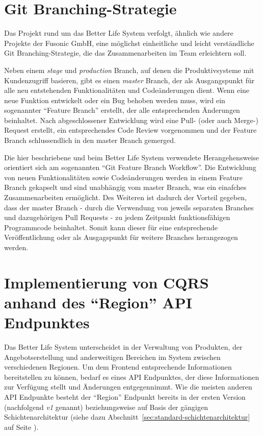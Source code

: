 \documentclass[a4paper,12pt,twoside]{scrreprt}
\begin{document}
\section{Git Branching-Strategie}
\label{sec:git-branching-strategie}
Das Projekt rund um das Better Life System verfolgt, ähnlich wie andere Projekte der Fusonic GmbH, eine möglichst einheitliche und leicht verständliche Git Branching-Strategie, die das Zusammenarbeiten im Team erleichtern soll.

\medskip

Neben einem \textit{stage} und \textit{production} Branch, auf denen die Produktivsysteme mit Kundenzugriff basieren, gibt es einen \textit{master} Branch, der als Ausgangspunkt für alle neu entstehenden Funktionalitäten und Codeänderungen dient. Wenn eine neue Funktion entwickelt oder ein Bug behoben werden muss, wird ein sogenannter \enquote{Feature Branch} erstellt, der alle entsprechenden Änderungen beinhaltet. Nach abgeschlossener Entwicklung wird eine Pull- (oder auch Merge-) Request erstellt, ein entsprechendes Code Review vorgenommen und der Feature Branch schlussendlich in den master Branch gemerged.

\medskip

Die hier beschriebene und beim Better Life System verwendete Herangehensweise orientiert sich am sogenannten \enquote{Git Feature Branch Workflow}. Die Entwicklung von neuen Funktionalitäten sowie Codeänderungen werden in einem Feature Branch gekapselt und sind unabhängig vom master Branch, was ein einafches Zusammenarbeiten ermöglicht. Des Weiteren ist dadurch der Vorteil gegeben, dass der master Branch - durch die Verwendung von jeweils separaten Branches und dazugehörigen Pull Requests - zu jedem Zeitpunkt funktionsfähigen Programmcode beinhaltet. Somit kann dieser für eine entsprechende Veröffentlichung oder als Ausgagspunkt für weitere Branches herangezogen werden. \parencite[]{atlassian_git_2020}

\clearpage

\section{Implementierung von CQRS anhand des \enquote{Region} API Endpunktes}
\label{sec:cqrs-implementierung-region}
Das Better Life System unterscheidet in der Verwaltung von Produkten, der Angebotserstellung und anderweitigen Bereichen im System zwischen verschiedenen Regionen. Um dem Frontend entsprechende Informationen bereitstellen zu können, bedarf es eines API Endpunktes, der diese Informationen zur Verfügung stellt und Änderungen entgegennimmt. Wie die meisten anderen API Endpunkte besteht der \enquote{Region} Endpunkt bereits in der ersten Version (nachfolgend \textit{v1} genannt) beziehungsweise auf Basis der gängigen Schichtenarchitektur (siehe dazu Abschnitt~\ref{sec:standard-schichtenarchitektur} auf Seite \pageref{sec:standard-schichtenarchitektur}).
\end{document}
